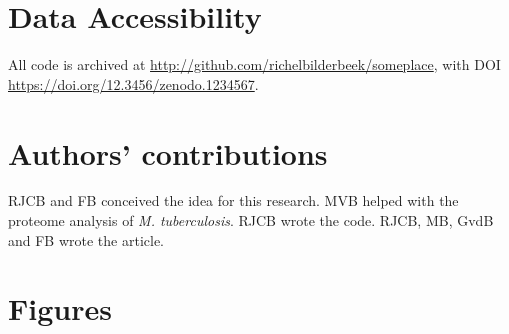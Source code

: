 \section{Data Accessibility}

All code is archived at \url{http://github.com/richelbilderbeek/someplace},
with DOI \url{https://doi.org/12.3456/zenodo.1234567}.

\section{Authors' contributions}

RJCB and FB conceived the idea for this research. 
MVB helped with the proteome analysis of \emph{M. tuberculosis}.
RJCB wrote the code.
RJCB, MB, GvdB and FB wrote the article.


%


\newpage
\section{Figures}

\newpage

\thispagestyle{empty}

